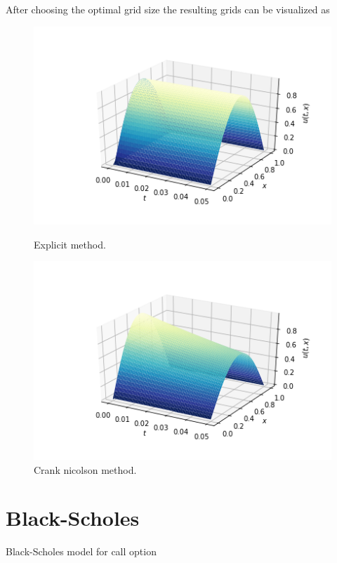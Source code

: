 \documentclass[12pt, oneside]{book}
\theoremstyle{plain}
\theoremstyle{definition}
\begin{document}
After choosing the optimal grid size the resulting grids can be visualized as
\begin{figure}[!htb]
  \begin{minipage}[b]{0.5\textwidth}
    \includegraphics[width=\textwidth]{HeatExplicitGrid.png}
    \caption{Explicit method.}
  \end{minipage}
  \begin{minipage}[b]{0.5\textwidth}
    \includegraphics[width=\textwidth]{HeatCNGrid.png}
    \caption{Crank nicolson method.}
  \end{minipage}
\end{figure}

\section{Black-Scholes}
Black-Scholes model for call option
\end{document}
